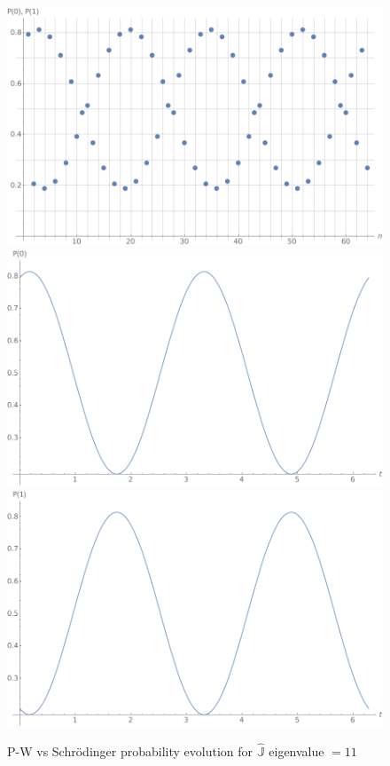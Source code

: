 \begin{figure}
  \centering
  \includegraphics[height=.3\textheight]{img/N32-B.png}
  \includegraphics[height=.3\textheight]{img/probB_0.png}
  \includegraphics[height=.3\textheight]{img/probB_1.png}
  \caption{P-W vs Schr{\"o}dinger probability evolution for $\hat{\mathbb{J}}$ eigenvalue $=11$}
  \label{fig:prob-comparison}
\end{figure}


